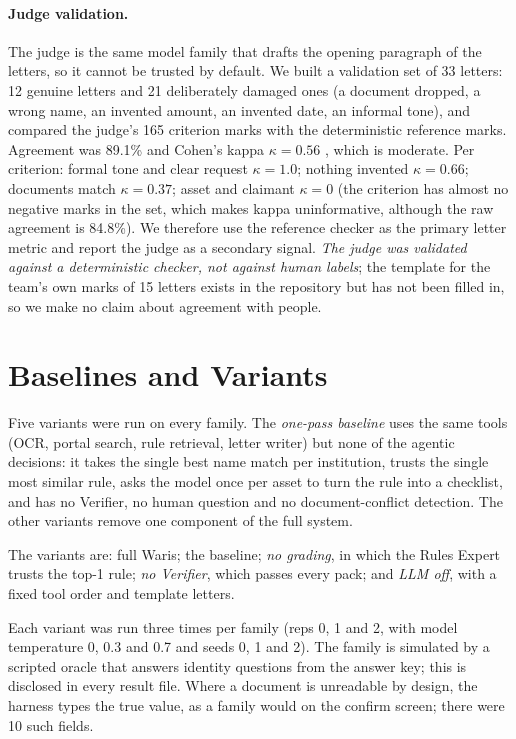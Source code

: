 \paragraph{Judge validation.} The judge is the same model family that drafts the opening paragraph of the letters, so it cannot be trusted by default. We built a validation set of 33 letters: 12 genuine letters and 21 deliberately damaged ones (a document dropped, a wrong name, an invented amount, an invented date, an informal tone), and compared the judge's 165 criterion marks with the deterministic reference marks. Agreement was 89.1\% and Cohen's kappa $\kappa=0.56$ \cite{cohen1960kappa}, which is moderate. Per criterion: formal tone and clear request $\kappa=1.0$; nothing invented $\kappa=0.66$; documents match $\kappa=0.37$; asset and claimant $\kappa=0$ (the criterion has almost no negative marks in the set, which makes kappa uninformative, although the raw agreement is 84.8\%). We therefore use the reference checker as the primary letter metric and report the judge as a secondary signal. \emph{The judge was validated against a deterministic checker, not against human labels}; the template for the team's own marks of 15 letters exists in the repository but has not been filled in, so we make no claim about agreement with people.

\section{Baselines and Variants}
Five variants were run on every family. The \emph{one-pass baseline} uses the same tools (OCR, portal search, rule retrieval, letter writer) but none of the agentic decisions: it takes the single best name match per institution, trusts the single most similar rule, asks the model once per asset to turn the rule into a checklist, and has no Verifier, no human question and no document-conflict detection. The other variants remove one component of the full system.

The variants are: full Waris; the baseline; \emph{no grading}, in which the Rules Expert trusts the top-1 rule; \emph{no Verifier}, which passes every pack; and \emph{LLM off}, with a fixed tool order and template letters.

Each variant was run three times per family (reps 0, 1 and 2, with model temperature 0, 0.3 and 0.7 and seeds 0, 1 and 2). The family is simulated by a scripted oracle that answers identity questions from the answer key; this is disclosed in every result file. Where a document is unreadable by design, the harness types the true value, as a family would on the confirm screen; there were 10 such fields.

